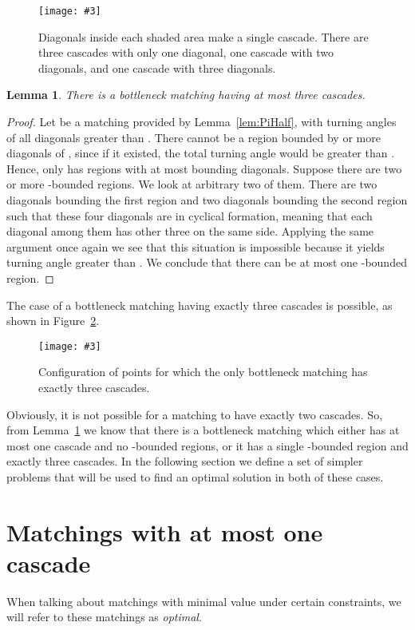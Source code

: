\documentclass[a4paper, 11pt]{article}
\newtheorem{lemma}[theorem]{Lemma}
\newcommand{\fig}[3]{
	\begin{figure}[ht]
		\centering
		\texttt{[image: \#3]}
		\caption{#2}
		\label{#1}
	\end{figure}
}
\begin{document}
\fig{fig:Cascades}{Diagonals inside each shaded area make a single cascade. There are three cascades with only one diagonal, one cascade with two diagonals, and one cascade with three diagonals.}{Cascades.pdf}


\begin{lemma}
	\label{lem:ThreeCascades}
	There is a bottleneck matching having at most three cascades.
\end{lemma}
\begin{proof}
	Let  be a matching provided by Lemma~\ref{lem:PiHalf}, with turning angles of all diagonals greater than . There cannot be a region bounded by  or more diagonals of , since if it existed, the total turning angle would be greater than . Hence,  only has regions with at most  bounding diagonals. Suppose there are two or more -bounded regions. We look at arbitrary two of them. There are two diagonals bounding the first region and two diagonals bounding the second region such that these four diagonals are in cyclical formation, meaning that each diagonal among them has other three on the same side. Applying the same argument once again we see that this situation is impossible because it yields turning angle greater than . We conclude that there can be at most one -bounded region. 
\end{proof}

The case of a bottleneck matching having exactly three cascades is possible, as shown in Figure~\ref{fig:ThreeCascadesExample}.

\fig{fig:ThreeCascadesExample}{Configuration of points for which the only bottleneck matching has exactly three cascades.}{ThreeCascadesExample.pdf}

Obviously, it is not possible for a matching to have exactly two cascades. So, from Lemma~\ref{lem:ThreeCascades} we know that there is a bottleneck matching which either has at most one cascade and no -bounded regions, or it has a single -bounded region and exactly three cascades. In the following section we define a set of simpler problems that will be used to find an optimal solution in both of these cases.


\section{Matchings with at most one cascade}
\label{sec:Subproblems}

When talking about matchings with minimal value under certain constraints, we will refer to these matchings as \emph{optimal}.
\end{document}
